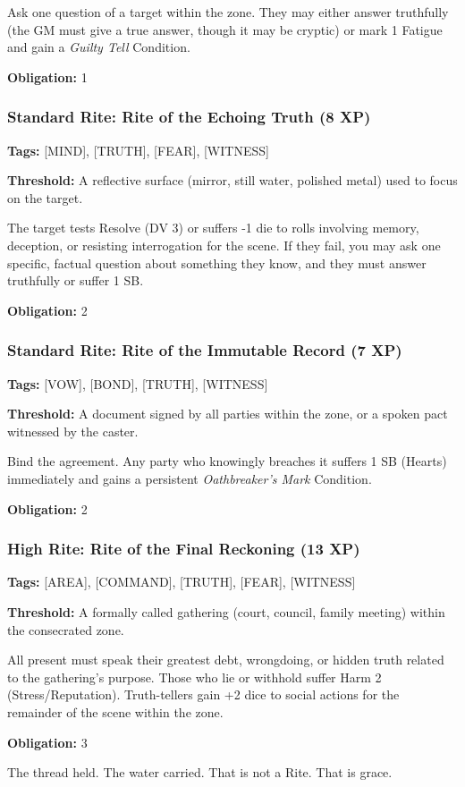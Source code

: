 Ask one question of a target within the zone. They may either answer truthfully (the GM must give a true answer, though it may be cryptic) or mark 1 Fatigue and gain a \textit{Guilty Tell} Condition.

\textbf{Obligation:} 1

\subsubsection{Standard Rite: Rite of the Echoing Truth (8 XP)}

\textbf{Tags:} [MIND], [TRUTH], [FEAR], [WITNESS]

\textbf{Threshold:} A reflective surface (mirror, still water, polished metal) used to focus on the target.

The target tests Resolve (DV 3) or suffers -1 die to rolls involving memory, deception, or resisting interrogation for the scene. If they fail, you may ask one specific, factual question about something they know, and they must answer truthfully or suffer 1 SB.

\textbf{Obligation:} 2

\subsubsection{Standard Rite: Rite of the Immutable Record (7 XP)}

\textbf{Tags:} [VOW], [BOND], [TRUTH], [WITNESS]

\textbf{Threshold:} A document signed by all parties within the zone, or a spoken pact witnessed by the caster.

Bind the agreement. Any party who knowingly breaches it suffers 1 SB (Hearts) immediately and gains a persistent \textit{Oathbreaker's Mark} Condition.

\textbf{Obligation:} 2

\subsubsection{High Rite: Rite of the Final Reckoning (13 XP)}

\textbf{Tags:} [AREA], [COMMAND], [TRUTH], [FEAR], [WITNESS]

\textbf{Threshold:} A formally called gathering (court, council, family meeting) within the consecrated zone.

All present must speak their greatest debt, wrongdoing, or hidden truth related to the gathering's purpose. Those who lie or withhold suffer Harm 2 (Stress/Reputation). Truth-tellers gain +2 dice to social actions for the remainder of the scene within the zone.

\textbf{Obligation:} 3

The thread held. The water carried. That is not a Rite. That is grace.
